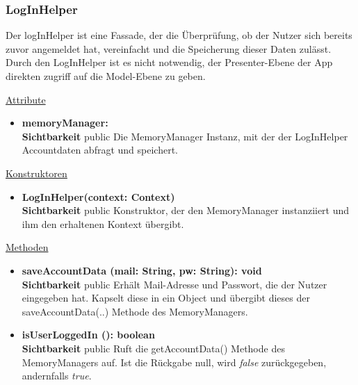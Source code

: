 \subsubsection{LogInHelper} \label{app:klasse:LogInHelper}
Der logInHelper ist eine Fassade, der die Überprüfung, ob der Nutzer sich bereits zuvor angemeldet hat, vereinfacht und die Speicherung dieser Daten zulässt. Durch den LogInHelper ist es nicht notwendig, der Presenter-Ebene der App direkten zugriff auf die Model-Ebene zu geben.
\newline

\underline{Attribute}
\begin{itemize}
\itemsep0pt
\item \textbf{memoryManager: } \hfill\\ 
\textbf{Sichtbarkeit} public\newline
Die MemoryManager Instanz, mit der der LogInHelper Accountdaten abfragt und speichert.

\end{itemize}

\underline{Konstruktoren}
\begin{itemize}
\itemsep0pt
\item \textbf{LogInHelper(context: Context)} \hfill\\
\textbf{Sichtbarkeit} public\newline
Konstruktor, der den MemoryManager instanziiert und ihm den erhaltenen Kontext übergibt. 
\end{itemize}

\underline{Methoden}
\begin{itemize}
\itemsep0pt
\item \textbf{saveAccountData (mail: String, pw: String): void}\hfill\\
\textbf{Sichtbarkeit} public\newline
Erhält Mail-Adresse und Passwort, die der Nutzer eingegeben hat. Kapselt diese in ein  Object und übergibt dieses der saveAccountData(..) Methode des MemoryManagers.

\item \textbf{isUserLoggedIn (): boolean}\hfill\\
\textbf{Sichtbarkeit} public\newline
Ruft die getAccountData() Methode des MemoryManagers auf. Ist die Rückgabe null, wird \textit{false} zurückgegeben, andernfalls \textit{true}.

\end{itemize}